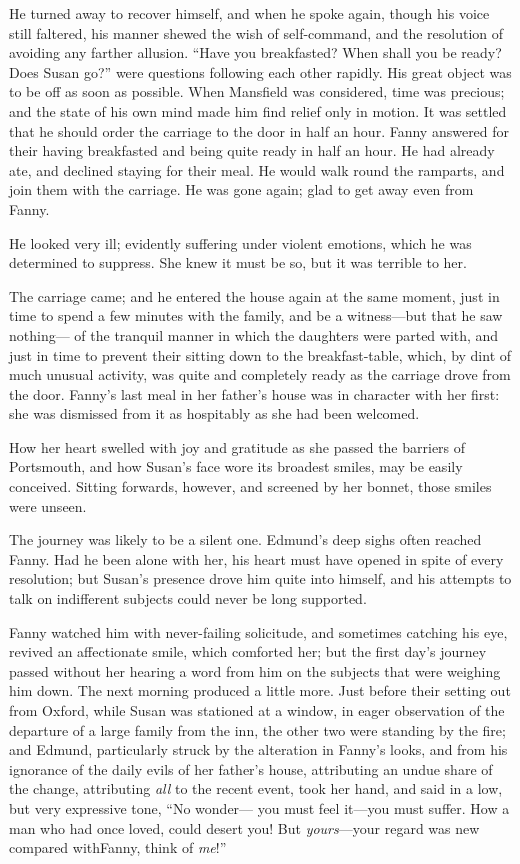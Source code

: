 He turned away to recover himself, and when he spoke again,
though his voice still faltered, his manner shewed
the wish of self-command, and the resolution of avoiding
any farther allusion.  ``Have you breakfasted?  When shall
you be ready?  Does Susan go?'' were questions following
each other rapidly.  His great object was to be off
as soon as possible.  When Mansfield was considered,
time was precious; and the state of his own mind made
him find relief only in motion.  It was settled that he
should order the carriage to the door in half an hour.
Fanny answered for their having breakfasted and being quite
ready in half an hour.  He had already ate, and declined
staying for their meal.  He would walk round the ramparts,
and join them with the carriage.  He was gone again;
glad to get away even from Fanny.

He looked very ill; evidently suffering under
violent emotions, which he was determined to suppress.
She knew it must be so, but it was terrible to her.

The carriage came; and he entered the house again at
the same moment, just in time to spend a few minutes with
the family, and be a witness---but that he saw nothing---%
of the tranquil manner in which the daughters were
parted with, and just in time to prevent their sitting
down to the breakfast-table, which, by dint of much
unusual activity, was quite and completely ready as
the carriage drove from the door.  Fanny's last meal
in her father's house was in character with her first:
she was dismissed from it as hospitably as she had been welcomed.

How her heart swelled with joy and gratitude as she
passed the barriers of Portsmouth, and how Susan's face
wore its broadest smiles, may be easily conceived.
Sitting forwards, however, and screened by her bonnet,
those smiles were unseen.

The journey was likely to be a silent one.  Edmund's deep
sighs often reached Fanny.  Had he been alone with her,
his heart must have opened in spite of every resolution;
but Susan's presence drove him quite into himself, and his
attempts to talk on indifferent subjects could never be
long supported.

Fanny watched him with never-failing solicitude,
and sometimes catching his eye, revived an affectionate smile,
which comforted her; but the first day's journey passed
without her hearing a word from him on the subjects
that were weighing him down.  The next morning produced
a little more.  Just before their setting out from Oxford,
while Susan was stationed at a window, in eager observation
of the departure of a large family from the inn,
the other two were standing by the fire; and Edmund,
particularly struck by the alteration in Fanny's looks,
and from his ignorance of the daily evils of her
father's house, attributing an undue share of the change,
attributing \emph{all} to the recent event, took her hand,
and said in a low, but very expressive tone, ``No wonder---%
you must feel it---you must suffer.  How a man who had
once loved, could desert you!  But \emph{yours}---your regard
was new compared with\gdash{}Fanny, think of \emph{me}!''

